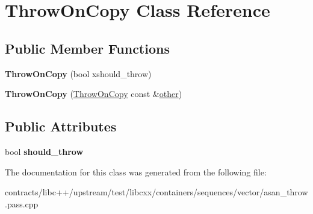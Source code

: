 \hypertarget{class_throw_on_copy}{}\section{Throw\+On\+Copy Class Reference}
\label{class_throw_on_copy}
\subsection*{Public Member Functions}
\begin{DoxyCompactItemize}
\item 
\mbox{\label{class_throw_on_copy_ab837a48921a09e75c19339e67f8693a9}} 
{\bfseries Throw\+On\+Copy} (bool xshould\+\_\+throw)
\item 
\mbox{\label{class_throw_on_copy_a30539ed25a8a909c0bec56cb3de20d05}} 
{\bfseries Throw\+On\+Copy} (\mbox{\hyperlink{class_throw_on_copy}{Throw\+On\+Copy}} const \&\mbox{\hyperlink{structother}{other}})
\end{DoxyCompactItemize}
\subsection*{Public Attributes}
\begin{DoxyCompactItemize}
\item 
\mbox{\label{class_throw_on_copy_a0b507dd603b5d5c4dd40934010f1a0c3}} 
bool {\bfseries should\+\_\+throw}
\end{DoxyCompactItemize}


The documentation for this class was generated from the following file\+:\begin{DoxyCompactItemize}
\item 
contracts/libc++/upstream/test/libcxx/containers/sequences/vector/asan\+\_\+throw.\+pass.\+cpp\end{DoxyCompactItemize}
